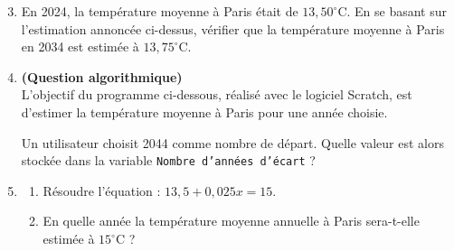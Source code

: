 \documentclass[exercice,a4]{thedocument}%
\begin{document}
\begin{enumerate}
	\setcounter{enumi}{2}
	\item En 2024, la température moyenne à Paris était de $13{,}50^{\circ}$C. En se basant sur l'estimation annoncée ci-dessus, vérifier que la température moyenne à Paris en 2034 est estimée à $13{,}75^{\circ}$C.
	\item \textbf{(Question algorithmique)}\\
	L'objectif du programme ci-dessous, réalisé avec le logiciel Scratch, est d'estimer la température moyenne à Paris pour une année choisie.

	\begin{center}
	\begin{scratch}[scale=0.9,num blocks]
	\end{scratch}
	\end{center}

	Un utilisateur choisit 2044 comme nombre de départ. Quelle valeur est alors stockée dans la variable \texttt{Nombre d'années d'écart} ?
	\item 
	\begin{enumerate}
		\item Résoudre l'équation : $13{,}5 + 0{,}025x = 15$.
		\item En quelle année la température moyenne annuelle à Paris sera-t-elle estimée à $15^{\circ}$C ?
	\end{enumerate}
\end{enumerate}

\medskip
\showthesource
\end{document}
